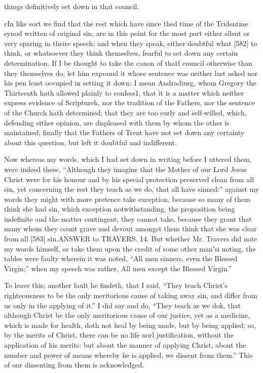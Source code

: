 things definitively set down in that council.

cIn like sort we find that the rest which have since thed time of the Tridentine synod written of original sin, are in this point for the most part either silent or very sparing in theire speech; and when they speak, either doubtful what [582] to think, or whatsoever they think themselves, fearful to set down any certain determination. If I be thought to take the canon of thatf council otherwise than they themselves do, let him expound it whose sentence was neither last asked nor his pen least occupied in setting it down; I mean Andradiusg, whom Gregory the Thirteenth hath allowed plainly to confess1, that it is a matter which neither express evidence of Scriptureh, nor the tradition of the Fathers, nor the sentence of the Church hath determined; that they are too surly and self-willed, which, defending either opinion, are displeased with them by whom the other is maintained; finally that the Fathers of Trent have not set down any certainty about this question, but left it doubtful and indifferent.

Now whereas my words, which I had set down in writing before I uttered them, were indeed these, “Although they imagine that the Mother of our Lord Jesus Christ were for his honour and by his special protection preserved clean from all sin, yet concerning the rest they teach as we do, that all have sinned:” against my words they might with more pretence take exception, because so many of them think she had sin, which exception notwithstanding, the proposition being indefinite and the matter contingent, they cannot take, because they grant that many whom they count grave and devout amongst them think that she was clear from all [583] sin.ANSWER to TRAVERS. 14. But whether Mr. Travers did note my words himself, or take them upon the credit of some other man’si noting, the tables were faulty wherein it was noted, “All men sinners, even the Blessed Virgin;” when my speech was rather, All men except the Blessed Virgin.”

To leave this; another fault he findeth, that I said, “They teach Christ’s righteousness to be the only meritorious cause of taking away sin, and differ from us only in the applying of it.” I did say and do, “They teach as we dok, that although Christ be the only meritorious cause of our justice, yet as a medicine, which is made for health, doth not heal by being made, but by being applied; so, by the merits of Christ, there can be no life norl justification, without the application of his merits: but about the manner of applying Christ, about the number and power of means whereby he is applied, we dissent from them.” This of our dissenting from them is acknowledged.

